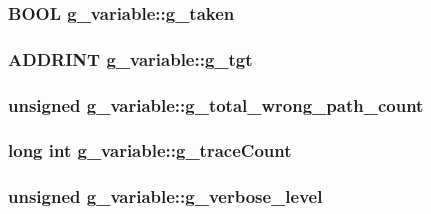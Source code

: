 \label{structg__variable_a5a33fdb5e89c73f560a2e4ced38ecbf5}
\hypertarget{structg__variable_a992a1e746b4ab8d8ef422b522300f769}{
\subsubsection[{g\_\-taken}]{\setlength{\rightskip}{0pt plus 5cm}BOOL {\bf g\_\-variable::g\_\-taken}}}
\label{structg__variable_a992a1e746b4ab8d8ef422b522300f769}
\hypertarget{structg__variable_a34e0ec891cac1d35b52ed384463a0cf9}{
\subsubsection[{g\_\-tgt}]{\setlength{\rightskip}{0pt plus 5cm}ADDRINT {\bf g\_\-variable::g\_\-tgt}}}
\label{structg__variable_a34e0ec891cac1d35b52ed384463a0cf9}
\hypertarget{structg__variable_a155baf9caa1600f209b109f6eebf50eb}{
\subsubsection[{g\_\-total\_\-wrong\_\-path\_\-count}]{\setlength{\rightskip}{0pt plus 5cm}unsigned {\bf g\_\-variable::g\_\-total\_\-wrong\_\-path\_\-count}}}
\label{structg__variable_a155baf9caa1600f209b109f6eebf50eb}
\hypertarget{structg__variable_ad00b3634585f9cc7e89adb907114a290}{
\subsubsection[{g\_\-traceCount}]{\setlength{\rightskip}{0pt plus 5cm}long int {\bf g\_\-variable::g\_\-traceCount}}}
\label{structg__variable_ad00b3634585f9cc7e89adb907114a290}
\hypertarget{structg__variable_ac965e96976bbbeb71833c68438b5fc47}{
\subsubsection[{g\_\-verbose\_\-level}]{\setlength{\rightskip}{0pt plus 5cm}unsigned {\bf g\_\-variable::g\_\-verbose\_\-level}}}
